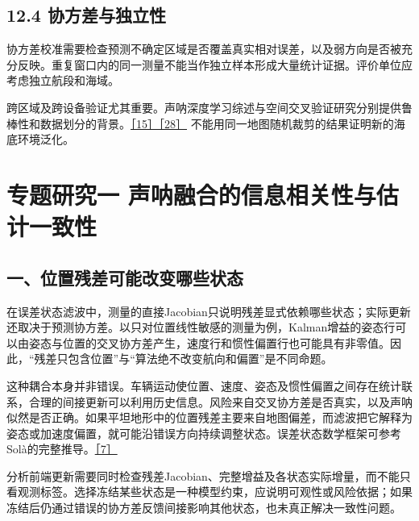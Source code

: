 \hypertarget{ux534fux65b9ux5deeux4e0eux72ecux7acbux6027}{%
\subsection{12.4 协方差与独立性}\label{ux534fux65b9ux5deeux4e0eux72ecux7acbux6027}}

协方差校准需要检查预测不确定区域是否覆盖真实相对误差，以及弱方向是否被充分反映。重复窗口内的同一测量不能当作独立样本形成大量统计证据。评价单位应考虑独立航段和海域。

跨区域及跨设备验证尤其重要。声呐深度学习综述与空间交叉验证研究分别提供鲁棒性和数据划分的背景。\href{https://arxiv.org/abs/2412.11840}{［15］}\href{https://doi.org/10.1111/ecog.02881}{［28］} 不能用同一地图随机裁剪的结果证明新的海底环境泛化。

\hypertarget{ux4e13ux9898ux7814ux7a76ux4e00-ux58f0ux5450ux878dux5408ux7684ux4fe1ux606fux76f8ux5173ux6027ux4e0eux4f30ux8ba1ux4e00ux81f4ux6027}{%
\section{专题研究一 声呐融合的信息相关性与估计一致性}\label{ux4e13ux9898ux7814ux7a76ux4e00-ux58f0ux5450ux878dux5408ux7684ux4fe1ux606fux76f8ux5173ux6027ux4e0eux4f30ux8ba1ux4e00ux81f4ux6027}}

\hypertarget{ux4e00ux4f4dux7f6eux6b8bux5deeux53efux80fdux6539ux53d8ux54eaux4e9bux72b6ux6001}{%
\subsection{一、位置残差可能改变哪些状态}\label{ux4e00ux4f4dux7f6eux6b8bux5deeux53efux80fdux6539ux53d8ux54eaux4e9bux72b6ux6001}}

在误差状态滤波中，测量的直接Jacobian只说明残差显式依赖哪些状态；实际更新还取决于预测协方差。以只对位置线性敏感的测量为例，Kalman增益的姿态行可以由姿态与位置的交叉协方差产生，速度行和惯性偏置行也可能具有非零值。因此，``残差只包含位置''与``算法绝不改变航向和偏置''是不同命题。

这种耦合本身并非错误。车辆运动使位置、速度、姿态及惯性偏置之间存在统计联系，合理的间接更新可以利用历史信息。风险来自交叉协方差是否真实，以及声呐似然是否正确。如果平坦地形中的位置残差主要来自地图偏差，而滤波把它解释为姿态或加速度偏置，就可能沿错误方向持续调整状态。误差状态数学框架可参考Solà的完整推导。\href{https://arxiv.org/abs/1711.02508}{［7］}

分析前端更新需要同时检查残差Jacobian、完整增益及各状态实际增量，而不能只看观测标签。选择冻结某些状态是一种模型约束，应说明可观性或风险依据；如果冻结后仍通过错误的协方差反馈间接影响其他状态，也未真正解决一致性问题。


